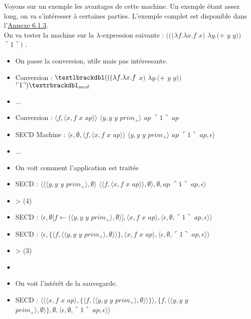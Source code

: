 \documentclass[10pt,a4paper]{report}
\begin{document}
Voyons sur un exemple les avantages de cette machine. Un exemple étant assez long, on va s'intéresser à certaines parties. L'exemple complet est disponible dans l'\hyperref[SECD]{Annexe 6.1.3}. 
\\
On va tester la machine sur la $\lambda$-expression suivante : $(((\lambda f.\lambda x.f$ $x)$ $\lambda y.(+$ $y$ $y))$ $\ulcorner 1\urcorner)$ .
\bigbreak

\begin{itemize}
\item[] On passe la conversion, utile mais pas intéressante.
\item[] Conversion : $\textlbrackdbl(((\lambda f.\lambda x.f$ $x)$ $\lambda y.(+$ $y$ $y))$ $\ulcorner 1\urcorner)\textrbrackdbl_{secd}$
\item[] ...
\item[] Conversion : $\langle f,\langle x,f$ $x$ $ap\rangle\rangle$ $\langle y,y$ $y$ $prim_{+}\rangle$ $ap$ $\ulcorner 1\urcorner$ $ap$
\item[] SECD Machine : $\langle\epsilon,\emptyset,\langle f,\langle x,f$ $x$ $ap\rangle\rangle$ $\langle y,y$ $y$ $prim_{+}\rangle$ $ap$ $\ulcorner 1\urcorner$ $ap,\epsilon\rangle$ 
\item[] ...
\item[] On voit comment l'application est traitée
\item[] SECD : $\langle\langle\langle y,y$ $y$ $prim_{+}\rangle,\emptyset\rangle$ $\langle\langle f,\langle x,f$ $x$ $ap\rangle\rangle,\emptyset\rangle,\emptyset,ap$ $\ulcorner 1\urcorner$ $ap,\epsilon\rangle$
\item[] > (4)
\item[] SECD : $\langle\epsilon,\emptyset[f \leftarrow \langle\langle y,y$ $y$ $prim_{+}\rangle,\emptyset\rangle],\langle x,f$ $x$ $ap\rangle,\langle\epsilon,\emptyset,\ulcorner 1\urcorner$ $ap,\epsilon\rangle\rangle$
\item[] SECD : $\langle\epsilon,\{\langle f,\langle\langle y,y$ $y$ $prim_{+}\rangle,\emptyset\rangle\rangle\},\langle x,f$ $x$ $ap\rangle,\langle\epsilon,\emptyset,\ulcorner 1\urcorner$ $ap,\epsilon\rangle\rangle$
\item[] >  (3)
\item[] 
\item[] On voit l'intérêt de la sauvegarde.
\item[] SECD : $\langle\langle\langle x,f$ $x$ $ap\rangle,\{\langle f,\langle\langle y,y$ $y$ $prim_{+}\rangle,\emptyset\rangle\rangle\}\rangle,\{f,\langle\langle y,y$ $y$ $prim_{+}\rangle,\emptyset\rangle\},\emptyset,\langle\epsilon,\emptyset,\ulcorner 1\urcorner$ $ap,\epsilon\rangle\rangle$

\end{itemize}
\end{document}
